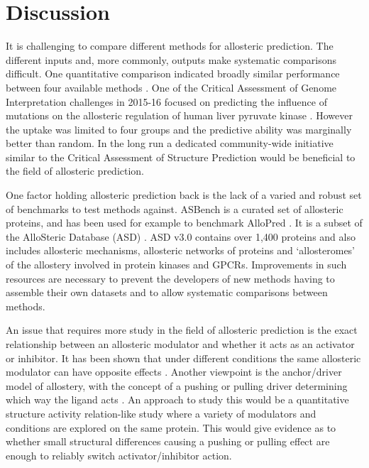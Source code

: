 \section{Discussion}

It is challenging to compare different methods for allosteric prediction.
The different inputs and, more commonly, outputs make systematic comparisons difficult.
One quantitative comparison indicated broadly similar performance between four available methods \cite{Greener2017}.
One of the Critical Assessment of Genome Interpretation challenges in 2015-16 focused on predicting the influence of mutations on the allosteric regulation of human liver pyruvate kinase \cite{Xu2017}.
However the uptake was limited to four groups and the predictive ability was marginally better than random.
In the long run a dedicated community-wide initiative similar to the Critical Assessment of Structure Prediction \cite{Moult2016} would be beneficial to the field of allosteric prediction.

One factor holding allosteric prediction back is the lack of a varied and robust set of benchmarks to test methods against.
ASBench \cite{Huang2015} is a curated set of allosteric proteins, and has been used for example to benchmark AlloPred \cite{Greener2015}.
It is a subset of the AlloSteric Database (ASD) \cite{Shen2016}.
ASD v3.0 contains over 1,400 proteins and also includes allosteric mechanisms, allosteric networks of proteins and `allosteromes' of the allostery involved in protein kinases and GPCRs.
Improvements in such resources are necessary to prevent the developers of new methods having to assemble their own datasets \cite{Panjkovich2012, Mitternacht2011, Amor2016} and to allow systematic comparisons between methods.

An issue that requires more study in the field of allosteric prediction is the exact relationship between an allosteric modulator and whether it acts as an activator or inhibitor.
It has been shown that under different conditions the same allosteric modulator can have opposite effects \cite{Motlagh2012}.
Another viewpoint is the anchor/driver model of allostery, with the concept of a pushing or pulling driver determining which way the ligand acts \cite{Nussinov2014}.
An approach to study this would be a quantitative structure activity relation-like study where a variety of modulators and conditions are explored on the same protein.
This would give evidence as to whether small structural differences causing a pushing or pulling effect are enough to reliably switch activator/inhibitor action.

